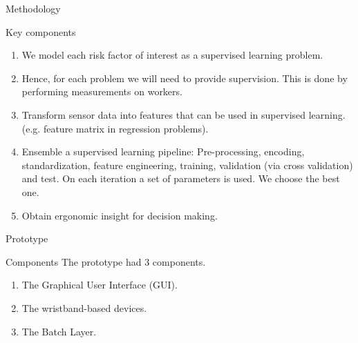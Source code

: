\begin{frame}{Methodology}
    \begin{alertblock}{Key components}
        \begin{enumerate}
            \item We model each risk factor of interest as a supervised learning problem.
            \item Hence, for each problem we will need to provide supervision. This is done by performing measurements on workers.
            \item Transform sensor data into features that can be used in supervised learning. (e.g. feature matrix in regression problems).
            \item Ensemble a supervised learning pipeline: Pre-processing, encoding, standardization, feature engineering, training, validation (via cross validation) and test. On each
            iteration a set of parameters is used. We choose the best one.
            \item Obtain ergonomic insight for decision making.
        \end{enumerate}
    \end{alertblock}
\end{frame}




\begin{frame}{Prototype}
    \begin{alertblock}{Components}
        The prototype had 3 components.
        \begin{enumerate}
            \item The Graphical User Interface (GUI).
            \item The wristband-based devices.
            \item The Batch Layer.
        \end{enumerate}
    \end{alertblock}
\end{frame}

